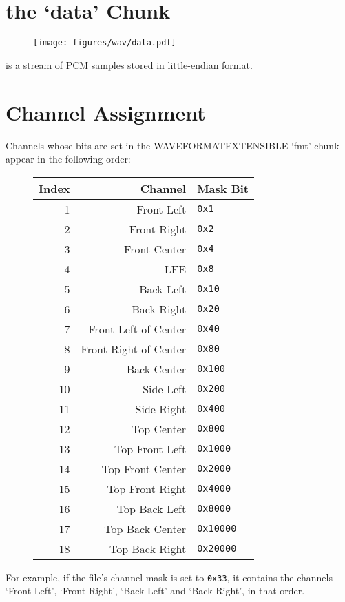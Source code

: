 \section{the `data' Chunk}
\begin{figure}[h]
\texttt{[image: figures/wav/data.pdf]}
\end{figure}
\par
\noindent
{} is a stream of PCM samples stored in little-endian format.

\pagebreak

\section{Channel Assignment}
\label{wave_channel_assignment}
Channels whose bits are set in the WAVEFORMATEXTENSIBLE `fmt' chunk
appear in the following order:
\begin{figure}[h]
\begin{tabular}{| r | r | l |}
\hline
Index & Channel & Mask Bit \\
\hline
1 & Front Left & \texttt{0x1} \\
2 & Front Right & \texttt{0x2} \\
3 & Front Center & \texttt{0x4} \\
4 & LFE & \texttt{0x8} \\
5 & Back Left & \texttt{0x10} \\
6 & Back Right & \texttt{0x20} \\
7 & Front Left of Center & \texttt{0x40} \\
8 & Front Right of Center & \texttt{0x80} \\
9 & Back Center & \texttt{0x100} \\
10 & Side Left & \texttt{0x200} \\
11 & Side Right & \texttt{0x400} \\
12 & Top Center & \texttt{0x800} \\
13 & Top Front Left & \texttt{0x1000} \\
14 & Top Front Center & \texttt{0x2000} \\
15 & Top Front Right & \texttt{0x4000} \\
16 & Top Back Left & \texttt{0x8000} \\
17 & Top Back Center & \texttt{0x10000} \\
18 & Top Back Right & \texttt{0x20000} \\
\hline
\end{tabular}
\end{figure}
\par
\noindent
For example, if the file's channel mask is set to \texttt{0x33},
it contains the channels `Front Left', `Front Right',
`Back Left' and `Back Right', in that order.
